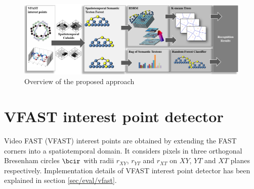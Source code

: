 \begin{figure}[ht]
	\centering  	
	\includegraphics[width=1.0\linewidth]{fig/act/fig1_new4.pdf}
	\caption{Overview of the proposed approach}
	\label{fig/act/flow}
\end{figure}

\section{VFAST interest point detector}
\label{sec/act/fastest}
Video FAST (VFAST) interest points are obtained by extending the FAST corners \cite{Rosten2006} into a spatiotemporal domain. It considers pixels in three orthogonal Bresenham circles $\bcir$ with radii $r_{XY}$, $r_{YT}$ and $r_{XT}$ on $XY$, $YT$ and $XT$ planes respectively. Implementation details of VFAST interest point detector has been explained in section \ref{sec/eval/vfast}. 


